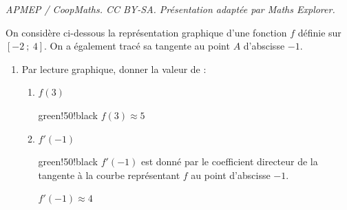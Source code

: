 \documentclass[10pt]{article}
\begin{document}
\noindent\textit{APMEP / CoopMaths. CC BY-SA. Présentation adaptée par Maths Explorer.}\par\medskip
On considère ci-dessous la représentation graphique d'une fonction $f$ définie sur $[-2~;~4]$. On a également tracé sa tangente au point $A$ d'abscisse $-1$.
	
	\medskip
	
	\begin{minipage}{0.46\linewidth}
		\begin{enumerate}
			\item Par lecture graphique, donner la valeur de :
			\begin{enumerate}
				\item $f(3)$
				
				\begin{color}{green!50!black}
				$f(3)\approx 5$
		 		\end{color}

				
				
				\item $f'(-1)$
				
				\begin{color}{green!50!black}
				$f'(-1)$ est donné par le coefficient directeur de la tangente à la courbe représentant $f$ au point d'abscisse $-1$.				
				
				$f'(-1)\approx 4$
		 		\end{color}
				
			\end{enumerate}
		\end{enumerate}
		
		
		
	\end{minipage}
	\hfill
\end{document}
